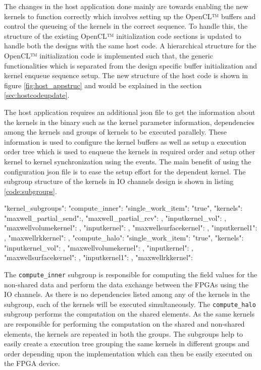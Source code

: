 The changes in the host application done mainly are towards enabling the new kernels to function correctly
which involves setting up the OpenCL™ buffers and control the queueing of the kernels in the correct sequence.
To handle this, the structure of the existing OpenCL™ initialization code sections is updated to handle
both the designs with the same host code. A hierarchical structure for the OpenCL™ initialization code
is implemented such that, the generic functionalities which is separated from the design specific buffer
initialization and kernel enqueue sequence setup. The new structure of the host code is shown
in figure \ref{fig:host_appstruc} and would be explained in the section \ref{sec:hostcodeupdate}.

The host application requires an additional json file to get the information about the kernels in the binary such as
the kernel parameter information, dependencies among the kernels and groups of kernels to be executed parallely.
These information is used to configure the kernel buffers as well as setup a execution order tree which is used
to enqueue the kernels in required order and setup other kernel to kernel synchronization using the events.
The main benefit of using the configuration json file is to ease the setup effort for the dependent kernel.
The subgroup structure of the kernels in IO channels design is shown in listing \ref{code:subgroups}.

\begin{JsonCode}[caption=Kernel subgroups used in Multi FPGA design to enqueue kernels, frame=tlrb, label=code:subgroups]
"kernel_subgroups":
{
    "compute_inner":
    {
        "single_work_item": "true",
        "kernels":
        {
            "maxwell_partial_send":{},
            "maxwell_partial_rcv": {},
            "inputkernel_vol": {},
            "maxwellvolumekernel": {},
            "inputkernel": {},
            "maxwellsurfacekernel": {},
            "inputkernel1": {},
            "maxwellrkkernel": {}
        }
    },
    "compute_halo":
    {
        "single_work_item": "true",
        "kernels":
        {
            "inputkernel_vol": {},
            "maxwellvolumekernel": {},
            "inputkernel": {},
            "maxwellsurfacekernel": {},
            "inputkernel1": {},
            "maxwellrkkernel": {}
        }
    }
}
\end{JsonCode}

The \texttt{compute\_inner} subgroup is responsible for computing the field values for the non-shared
data and perform the data exchange between the FPGAs using the IO channels. As there is no dependencies
listed among any of the kernels in the subgroup, each of the kernels will be executed simultaneously.
The \texttt{compute\_halo} subgroup performs the computation on the shared elements. As the same kernels
are responsible for performing the computation on the shared and non-shared elements, the kernels are
repeated in both the groups. The subgroups help to easily create a execution tree grouping
the same kernels in different groups and order depending upon the implementation which can then be
easily executed on the FPGA device.

